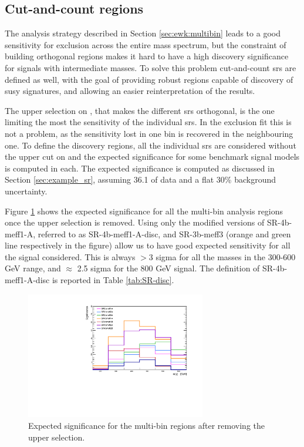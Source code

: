 \subsection{Cut-and-count regions}

The analysis strategy described in Section \ref{sec:ewk:multibin} leads to a good sensitivity for exclusion across the entire mass spectrum, 
but the constraint of building orthogonal regions makes it hard to have a high discovery significance 
for signals with intermediate masses. 
To solve this problem cut-and-count \glspl{sr} are defined as well, with the goal of
providing robust regions capable of discovery of \gls{susy} signatures, 
and allowing an easier reinterpretation of the results.

The upper selection on \meffb, that makes the different \glspl{sr} orthogonal, 
is the one limiting the most the sensitivity of the individual \glspl{sr}.
In the exclusion fit this is not a problem, as the sensitivity lost in one bin is recovered in the neighbouring one. 
To define the discovery regions, all the individual \glspl{sr} are considered without the upper cut on \meffb
and the expected significance for some benchmark signal models is computed in each. 
The expected significance is computed as discussed in Section \ref{sec:example_sr}, 
assuming 36.1 \ifb of data and a flat 30\% background uncertainty. 

Figure \ref{fig:ewk:disc_sig} shows the expected significance for all the multi-bin analysis regions once the upper \meffb 
selection is removed. 
Using only the modified versions of SR-4b-meff1-A, referred to as SR-4b-meff1-A-disc, 
and SR-3b-meff3 (orange and green line respectively in the figure) allow us to have good expected sensitivity for 
all the signal considered.  
This is always $>$3 sigma for all the masses in the 300-600 GeV range, and $\approx$ 2.5 sigma for the 800 GeV signal. 
The definition of SR-4b-meff1-A-disc is reported in Table \ref{tab:SR-disc}.

\begin{figure}[htbp]
\centering
\includegraphics[width=0.7\textwidth]{figures/ewk_prod/discovery/significances_hh_regions.pdf}
\caption{Expected significance for the multi-bin regions after removing the upper \meffb selection. 
\label{fig:ewk:disc_sig}
}
\end{figure}

